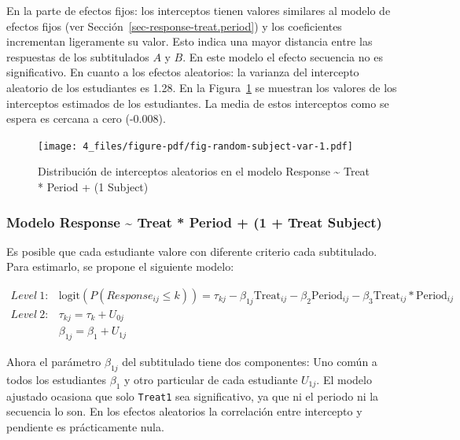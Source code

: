 \documentclass[
  12pt,
  a4paper,
  extrafontsizes,
  onecolumn,
  openright,
  table]{memoir}
\begin{document}
\normalsize

En la parte de efectos fijos: los interceptos tienen valores similares
al modelo de efectos fijos (ver Sección~\ref{sec-response-treat.period})
y los coeficientes incrementan ligeramente su valor. Esto indica una
mayor distancia entre las respuestas de los subtitulados \(A\) y \(B\).
En este modelo el efecto secuencia no es significativo. En cuanto a los
efectos aleatorios: la varianza del intercepto aleatorio de los
estudiantes es 1.28. En la Figura~\ref{fig-random-subject-var} se
muestran los valores de los interceptos estimados de los estudiantes. La
media de estos interceptos como se espera es cercana a cero (-0.008).

\begin{figure}[h]

{\centering \texttt{[image: 4\_files/figure-pdf/fig-random-subject-var-1.pdf]}

}

\caption[Distribución de interceptos
aleatorios.]{\label{fig-random-subject-var}Distribución de interceptos
aleatorios en el modelo Response \textasciitilde{} Treat * Period + (1
\textbar{} Subject)}

\end{figure}

\hypertarget{modelo-response-treat-period-1-treat-subject}{%
\subsubsection{Modelo Response \textasciitilde{} Treat * Period + (1 +
Treat \textbar{}
Subject)}\label{modelo-response-treat-period-1-treat-subject}}

Es posible que cada estudiante valore con diferente criterio cada
subtitulado. Para estimarlo, se propone el siguiente modelo:

\small

\[
\begin{aligned}
Level\ 1: & \text{logit}(P(Response_{ij} \leq k)) = \tau_{kj} - \beta_{1j} \text{Treat}_{ij} - \beta_{2} \text{Period}_{ij} - \beta_{3} \text{Treat}_{ij} * \text{Period}_{ij} \\
Level\ 2: & \tau_{kj}  =  \tau_{k} + U_{0j} \\
          & \beta_{1j}  =  \beta_{1} + U_{1j}
\end{aligned}
\]

\normalsize

Ahora el parámetro \(\beta_{1j}\) del subtitulado tiene dos componentes:
Uno común a todos los estudiantes \(\beta_{1}\) y otro particular de
cada estudiante \(U_{1j}\). El modelo ajustado ocasiona que solo
\texttt{Treat1} sea significativo, ya que ni el periodo ni la secuencia
lo son. En los efectos aleatorios la correlación entre intercepto y
pendiente es prácticamente nula.
\end{document}
